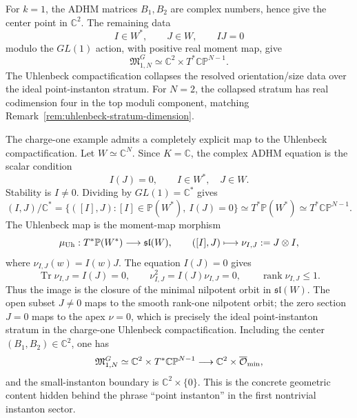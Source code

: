 \begin{example}
\label{ex:charge-one-gieseker-resolution}
For \(k=1\), the ADHM matrices \(B_1,B_2\) are complex numbers, hence give
the center point in \(\mathbb C^2\).  The remaining data
\[
  I\in W^\ast,\qquad J\in W,\qquad IJ=0
\]
modulo the \(GL(1)\) action, with positive real moment map, give
\[
  \mathfrak M_{1,N}^{G}\simeq \mathbb C^2\times T^\ast\mathbb{CP}^{N-1}.
\]
The Uhlenbeck compactification collapses the resolved orientation/size data
over the ideal point-instanton stratum.  For \(N=2\), the collapsed stratum
has real codimension four in the top moduli component, matching
Remark~\ref{rem:uhlenbeck-stratum-dimension}.
\end{example}

\begin{construction}
\label{cons:charge-one-uhlenbeck-nilpotent-resolution}
The charge-one example admits a completely explicit map to the Uhlenbeck
compactification.  Let \(W\simeq\mathbb C^N\).  Since \(K=\mathbb C\), the
complex ADHM equation is the scalar condition
\[
  I(J)=0,
  \qquad
  I\in W^\ast,\quad J\in W .
\]
Stability is \(I\ne0\).  Dividing by \(GL(1)=\mathbb C^\ast\) gives
\[
  (I,J)/\mathbb C^\ast
  =
  \{([I],J):[I]\in \mathbb P(W^\ast),\ I(J)=0\}
  \simeq T^\ast\mathbb P(W^\ast)
  \simeq T^\ast\mathbb{CP}^{N-1}.
\]
The Uhlenbeck map is the moment-map morphism
\begin{equation}
  \mu_{\rm Uh}:T^\ast\mathbb P(W^\ast)\longrightarrow \mathfrak{sl}(W),
  \qquad
  ([I],J)\longmapsto \nu_{I,J}:=J\otimes I,
  \label{eq:charge-one-uhlenbeck-moment-map}
\end{equation}
where \(\nu_{I,J}(w)=I(w)J\).  The equation \(I(J)=0\) gives
\[
  \operatorname{Tr}\nu_{I,J}=I(J)=0,
  \qquad
  \nu_{I,J}^2=I(J)\nu_{I,J}=0,
  \qquad
  \operatorname{rank}\nu_{I,J}\le1.
\]
Thus the image is the closure of the minimal nilpotent orbit in
\(\mathfrak{sl}(W)\).  The open subset \(J\ne0\) maps to the smooth
rank-one nilpotent orbit; the zero section \(J=0\) maps to the apex
\(\nu=0\), which is precisely the ideal point-instanton stratum in the
charge-one Uhlenbeck compactification.  Including the center
\((B_1,B_2)\in\mathbb C^2\), one has
\[
  \mathfrak M_{1,N}^{G}
  \simeq
  \mathbb C^2\times T^\ast\mathbb{CP}^{N-1}
  \longrightarrow
  \mathbb C^2\times \overline{\mathcal O}_{\rm min},
\]
and the small-instanton boundary is
\(\mathbb C^2\times\{0\}\).  This is the concrete geometric content hidden
behind the phrase ``point instanton'' in the first nontrivial instanton
sector.
\end{construction}

